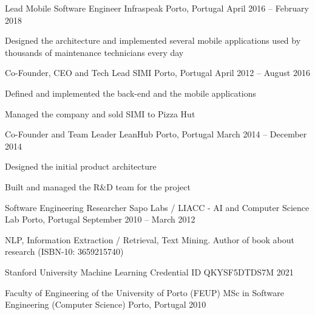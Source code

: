 \documentclass[]{awesome-cv}
\begin{document}
\begin{cventries}
	\vspace{-4mm}
	\cventry
	{Lead Mobile Software Engineer}
	{Infraspeak}
	{Porto, Portugal}
	{April 2016 – February 2018}
	{\begin{cvitems}
		\item {Designed the architecture and implemented several mobile applications used by thousands of maintenance technicians every day}
		\end{cvitems}}

	\vspace{-4mm}
	\cventry
	{Co-Founder, CEO and Tech Lead}
	{SIMI}
	{Porto, Portugal}
	{April 2012 – August 2016}
	{\begin{cvitems}
		\item {Defined and implemented the back-end and the mobile applications}
		\item {Managed the company and sold SIMI to Pizza Hut}
		\end{cvitems}}

	\vspace{-4mm}
	\cventry
	{Co-Founder and Team Leader}
	{LeanHub}
	{Porto, Portugal}
	{March 2014 – December 2014}
	{\begin{cvitems}
		\item {Designed the initial product architecture}
		\item {Built and managed the R\&D team for the project}
		\end{cvitems}}

	\vspace{-4mm}
	\cventry
	{Software Engineering Researcher}
	{Sapo Labs / LIACC - AI and Computer Science Lab}
	{Porto, Portugal}
	{September 2010 – March 2012}
	{\begin{cvitems}
		\item {NLP, Information Extraction / Retrieval, Text Mining. Author of book about research (ISBN-10: 3659215740)}
		\end{cvitems}}
\end{cventries}
\vspace{-5mm}

\vspace{-3mm}
\begin{cventries}
	\cventry
	{Stanford University}
	{Machine Learning}
	{Credential ID QKYSF5DTDS7M}
	{2021}
	{}

	\vspace{-7mm}
	\cventry
	{Faculty of Engineering of the University of Porto (FEUP)}
	{MSc in Software Engineering (Computer Science)}
	{Porto, Portugal}
	{2010}
	{}

\end{cventries}
\end{document}
